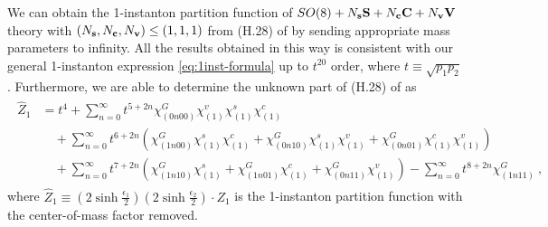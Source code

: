 \documentclass[letterpaper, 11pt]{article}
\def\e{\epsilon}
\begin{document}
{We can obtain the 1-instanton partition function of $SO(8) + N_{\bf s}\mathbf{S} + N_{\bf c}\mathbf{C} + N_{\bf v}\mathbf{V}$ theory with  $( N_{\bf s},  N_{\bf c}, N_{\bf v}) \leq ( 1,1,1)$ from (H.28) of \cite{DelZotto:2018tcj} by sending appropriate mass parameters to infinity.
All the results obtained in this way is consistent with our general 1-instanton expression \eqref{eq:1inst-formula} up to $t^{20}$ order, where $t \equiv \sqrt{p_1p_2}$. 
Furthermore, we are able to determine the unknown part of (H.28) of \cite{DelZotto:2018tcj} as 
\begin{align}
  \label{eq:SO8-v1s1c1}
  \begin{split}
 \hat{Z}_1 &=  t^4 + \sum_{n=0}^\infty t^{5+2n} \chi_{(0n00)}^G \chi^v_{(1)}\chi^s_{(1)}\chi^c_{(1)} \\
 &\quad + \sum_{n=0}^\infty t^{6+2n}\left(\chi_{(1n00)}^G \chi^s_{(1)}\chi^c_{(1)}+ \chi_{(0n10)}^G \chi^s_{(1)}\chi^v_{(1)}
  +\chi_{(0n01)}^G \chi^c_{(1)}\chi^v_{(1)}\right)\\
 &\quad  + \sum_{n=0}^\infty t^{7+2n} \left(\chi^G_{(1n10)}\chi^s_{(1)} + \chi^G_{(1n01)}\chi^c_{(1)}+\chi^G_{(0n11)}\chi^v_{(1)}\right)- \sum_{n=0}^\infty t^{8+2n}\chi^G_{(1n11)} \ ,
 \end{split}
\end{align}
where $\hat{Z}_1 \equiv (2\sinh{\frac{\e_{1}}{2}})(2\sinh{\frac{\e_{2}}{2}}) \cdot Z_1$ is the 1-instanton partition function with the center-of-mass factor removed. 


}
\end{document}
